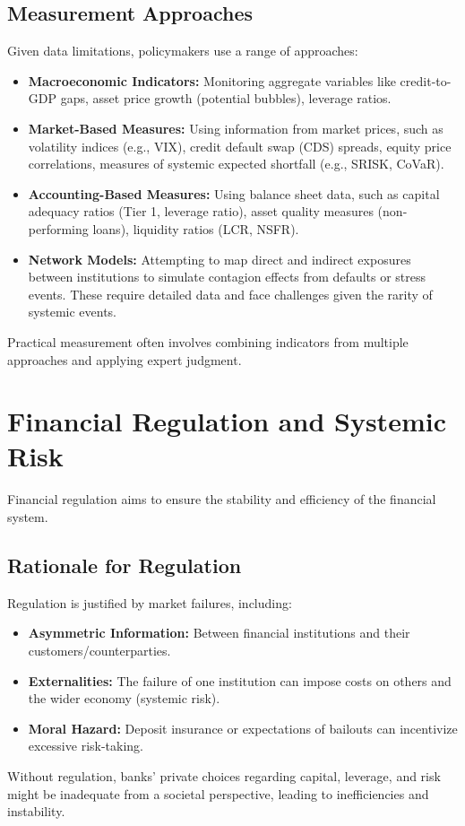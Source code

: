 \subsection{Measurement Approaches}
Given data limitations, policymakers use a range of approaches:
\begin{itemize}
    \item \textbf{Macroeconomic Indicators:} Monitoring aggregate variables like credit-to-GDP gaps, asset price growth (potential bubbles), leverage ratios.
    \item \textbf{Market-Based Measures:} Using information from market prices, such as volatility indices (e.g., VIX), credit default swap (CDS) spreads, equity price correlations, measures of systemic expected shortfall (e.g., SRISK, CoVaR).
    \item \textbf{Accounting-Based Measures:} Using balance sheet data, such as capital adequacy ratios (Tier 1, leverage ratio), asset quality measures (non-performing loans), liquidity ratios (LCR, NSFR).
    \item \textbf{Network Models:} Attempting to map direct and indirect exposures between institutions to simulate contagion effects from defaults or stress events. These require detailed data and face challenges given the rarity of systemic events.
\end{itemize}
Practical measurement often involves combining indicators from multiple approaches and applying expert judgment.

\section{Financial Regulation and Systemic Risk}

Financial regulation aims to ensure the stability and efficiency of the financial system.

\subsection{Rationale for Regulation}
Regulation is justified by market failures, including:
\begin{itemize}
    \item \textbf{Asymmetric Information:} Between financial institutions and their customers/counterparties.
    \item \textbf{Externalities:} The failure of one institution can impose costs on others and the wider economy (systemic risk).
    \item \textbf{Moral Hazard:} Deposit insurance or expectations of bailouts can incentivize excessive risk-taking.
\end{itemize}
Without regulation, banks' private choices regarding capital, leverage, and risk might be inadequate from a societal perspective, leading to inefficiencies and instability.

